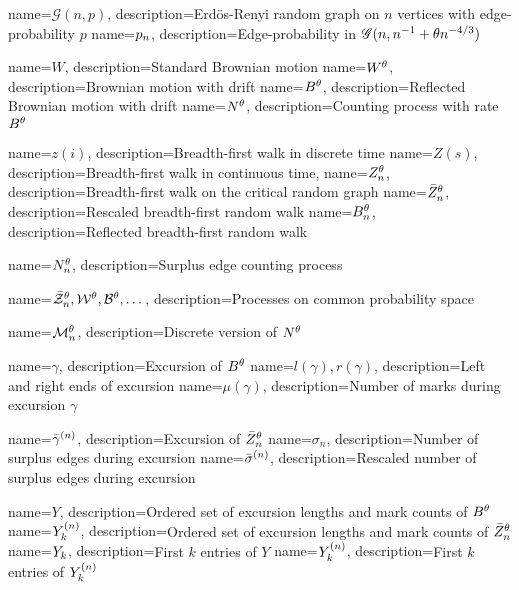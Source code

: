 
\usepackage[nopostdot, nonumberlist, toc, style = super]{glossaries}
\makenoidxglossaries 


{
	name={$\mathscr{G}(n,p)$},
	description={Erd\"os-Renyi random graph on $n$ vertices with edge-probability $p$}
}
{
	name={$p_n$},
	description={Edge-probability in $\mathscr{G}(n, n^{-1} + \theta n^{-4/3})$}
}



{
	name={$W$},
	description={Standard Brownian motion}
}
{
	name={$W^{\theta}$},
	description={Brownian motion with drift}
}
{
	name={$B^{\theta}$},
	description={Reflected Brownian motion with drift}
}
{
name={$N^{\theta}$},
description={Counting process with rate $B^{\theta}$}
}

{
	name={$z(i)$},
	description={Breadth-first walk in discrete time}
}
{
	name={$Z(s)$},
	description={Breadth-first walk in continuous time, \pageref{D: znt}}
}
{
	name={$Z_n^{\theta}$},
	description={Breadth-first walk on the critical random graph}
}
{
	name={$\bar{Z}^{\theta}_n$},
	description={Rescaled breadth-first random walk}
}
{
	name={$B_n^{\theta}$},
	description={Reflected breadth-first random walk}
}

{
name={$N_n^{\theta}$},
description={Surplus edge counting process}
}

{
name={$\bar{\mathcal{Z}}^{\theta}_n, \mathcal{W}^{\theta}, \mathcal{B}^{\theta}, \dots$},
description={Processes on common probability space}
}

{
name={$\mathcal{M}_n^{\theta}$},
description={Discrete version of $N^{\theta}$}
}



{
	name={$\gamma$},
	description={Excursion of $B^{\theta}$}
}
{
name={$l(\gamma), r(\gamma)$},
description={Left and right ends of excursion}
}
{
name={$\mu(\gamma)$},
description={Number of marks during excursion $\gamma$}
}

{
name={$\bar{\gamma}^{(n)}$},
description={Excursion of $\bar{Z}^{\theta}_n$}
}
{
name={$\sigma_n$},
description={Number of surplus edges during excursion}
}
{
name={$\bar{\sigma}^{(n)}$},
description={Rescaled number of surplus edges during excursion}
}

{
name={$Y$},
description={Ordered set of excursion lengths and mark counts of $B^{\theta}$}
}
{
name={${Y}^{(n)}_k$},
description={Ordered set of excursion lengths and mark counts of $\bar{Z}^{\theta}_n$}
}
{
name={${Y}_k$},
description={First $k$ entries of $Y$}
}
{
name={${Y}^{(n)}_k$},
description={First $k$ entries of ${Y}^{(n)}_k$}
}


